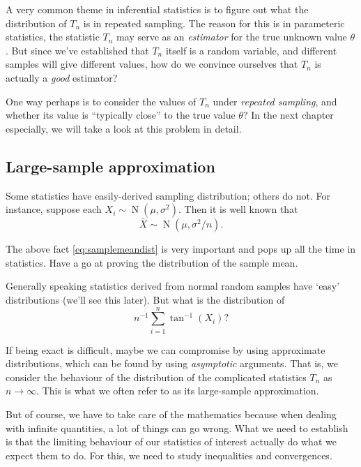 \documentclass[
]{book}
\DeclareMathOperator{\N}{N}
\theoremstyle{definition}
\theoremstyle{definition}
\theoremstyle{definition}
\theoremstyle{definition}
\theoremstyle{remark}
\begin{document}
A very common theme in inferential statistics is to figure out what the distribution of \(T_n\) is in repeated sampling.
The reason for this is in parameteric statistics, the statistic \(T_n\) may serve as an \emph{estimator} for the true unknown value \(\theta\).
But since we've established that \(T_n\) itself is a random variable, and different samples will give different values, how do we convince ourselves that \(T_n\) is actually a \emph{good} estimator?

One way perhaps is to consider the values of \(T_n\) under \emph{repeated sampling}, and whether its value is ``typically close'' to the true value \(\theta\)?
In the next chapter especially, we will take a look at this problem in detail.

\hypertarget{large-sample-approximation}{%
\subsection{Large-sample approximation}\label{large-sample-approximation}}

Some statistics have easily-derived sampling distribution; others do not.
For instance, suppose each \(X_i\sim\N(\mu,\sigma^2)\). Then it is well known that
\begin{equation}
\bar X \sim \N(\mu, \sigma^2/n). \label{eq:samplemeandist}
\end{equation}

The above fact \eqref{eq:samplemeandist} is very important and pops up all the time in statistics. Have a go at proving the distribution of the sample mean.

Generally speaking statistics derived from normal random samples have `easy' distributions (we'll see this later).
But what is the distribution of
\[
n^{-1}\sum_{i=1}^n \tan^{-1}(X_i)?
\]

If being exact is difficult, maybe we can compromise by using approximate distributions, which can be found by using \emph{asymptotic} arguments.
That is, we consider the behaviour of the distribution of the complicated statistics \(T_n\) as \(n\to\infty\).
This is what we often refer to as its large-sample approximation.

But of course, we have to take care of the mathematics because when dealing with infinite quantities, a lot of things can go wrong.
What we need to establish is that the limiting behaviour of our statistics of interest actually do what we expect them to do.
For this, we need to study inequalities and convergences.
\end{document}
